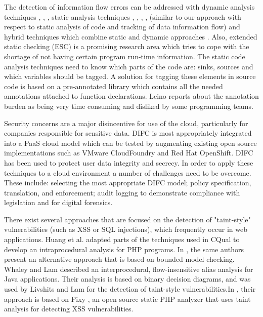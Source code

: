 The detection of information flow errors can be
addressed with dynamic analysis techniques \cite{ref_44_avgerinos:aeg}, \cite{ref_43_fenton:memoryless}, \cite{ref_42_sabelfeld:dynamic},
static analysis techniques \cite{ref_41_guarnieri:security}, \cite{ref_40_myers:jflow}, \cite{ref_39_simonet:report}, \cite{ref_38_volpano:sound}, \cite{ref_37_xiao:transparent} (similar
to our approach with respect to static analysis of code and
tracking of data information flow) and hybrid techniques which
combine static and dynamic approaches \cite{ref_36_moore:static}. Also, extended
static checking \cite{ref_35_david:extended} (ESC) is a promising research area which
tries to cope with the shortage of not having certain program
run-time information.
The static code analysis techniques need to know which
parts of the code are: sinks, sources and which variables
should be tagged. A solution for tagging these elements in
source code is based on a pre-annotated library which contains
all the needed annotations attached to function declarations.
Leino \cite{ref_34_leino:10years} reports about the annotation burden as being very
time consuming and disliked by some programming teams.

Security concerns are a major disincentive for use of the
cloud, particularly for companies responsible for sensitive
data. DIFC \cite{ref_74_bacon2014information} is most appropriately integrated into a PaaS cloud model which can be tested by augmenting
existing open source implementations such as VMware CloudFoundry
and Red Hat OpenShift. DIFC has been used to protect user
data integrity and secrecy. In order to apply these techniques
to a cloud environment a number of challenges need to be
overcome. These include: selecting the most appropriate DIFC
model; policy specification, translation, and enforcement; audit
logging to demonstrate compliance with legislation and for
digital forensics.

There exist several approaches that are focused on the detection of "taint-style" vulnerabilities (such as XSS or SQL injections), which
frequently occur in web applications. Huang et al. \cite{ref_75_huang2004securing}
adapted parts of the techniques used in CQual to develop
an intraprocedural analysis for PHP programs. In \cite{ref_76_huang2004verifying}, the
same authors present an alternative approach that is based
on bounded model checking. Whaley and Lam \cite{ref_77_whaley2004cloning} described an interprocedural, flow-insensitive alias analysis for Java applications. Their analysis is based on binary decision diagrams, and was used by Livshits and Lam \cite{ref_78_livshits2005finding} for the detection of taint-style vulnerabilities.In \cite{ref_62_balzarotti2008saner}, their approach is based on Pixy \cite{ref_79_jovanovic2010static,ref_80_jovanovic2006precise}, an open
source static PHP analyzer that uses taint analysis for detecting XSS vulnerabilities.

